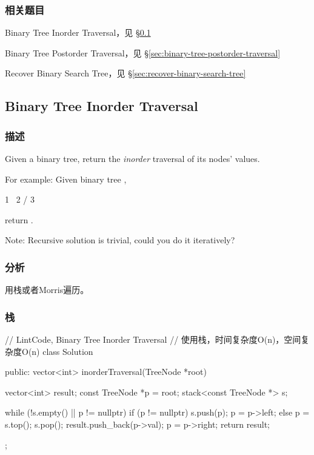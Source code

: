 \subsubsection{相关题目}
\begindot
\item Binary Tree Inorder Traversal，见 \S \ref{sec:binary-tree-inorder-traversal}
\item Binary Tree Postorder Traversal，见 \S \ref{sec:binary-tree-postorder-traversal}
\item Recover Binary Search Tree，见 \S \ref{sec:recover-binary-search-tree}
\myenddot


\subsection{Binary Tree Inorder Traversal}
\label{sec:binary-tree-inorder-traversal}


\subsubsection{描述}
Given a binary tree, return the \emph{inorder} traversal of its nodes' values.

For example:
Given binary tree ,
\begin{Code}
 1
  \
   2
  /
 3
\end{Code}
return \code{[1,3,2]}.

Note: Recursive solution is trivial, could you do it iteratively?


\subsubsection{分析}
用栈或者Morris遍历。


\subsubsection{栈}
\begin{Code}
// LintCode, Binary Tree Inorder Traversal
// 使用栈，时间复杂度O(n)，空间复杂度O(n)
class Solution {
public:
    vector<int> inorderTraversal(TreeNode *root) {
        vector<int> result;
        const TreeNode *p = root;
        stack<const TreeNode *> s;

        while (!s.empty() || p != nullptr) {
            if (p != nullptr) {
                s.push(p);
                p = p->left;
            } else {
                p = s.top();
                s.pop();
                result.push_back(p->val);
                p = p->right;
            }
        }
        return result;
    }
};
\end{Code}


